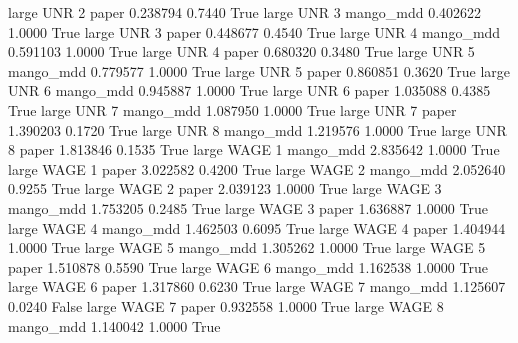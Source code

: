      large      UNR                 2                 paper      0.238794      0.7440    True
     large      UNR                 3             mango_mdd      0.402622      1.0000    True
     large      UNR                 3                 paper      0.448677      0.4540    True
     large      UNR                 4             mango_mdd      0.591103      1.0000    True
     large      UNR                 4                 paper      0.680320      0.3480    True
     large      UNR                 5             mango_mdd      0.779577      1.0000    True
     large      UNR                 5                 paper      0.860851      0.3620    True
     large      UNR                 6             mango_mdd      0.945887      1.0000    True
     large      UNR                 6                 paper      1.035088      0.4385    True
     large      UNR                 7             mango_mdd      1.087950      1.0000    True
     large      UNR                 7                 paper      1.390203      0.1720    True
     large      UNR                 8             mango_mdd      1.219576      1.0000    True
     large      UNR                 8                 paper      1.813846      0.1535    True
     large     WAGE                 1             mango_mdd      2.835642      1.0000    True
     large     WAGE                 1                 paper      3.022582      0.4200    True
     large     WAGE                 2             mango_mdd      2.052640      0.9255    True
     large     WAGE                 2                 paper      2.039123      1.0000    True
     large     WAGE                 3             mango_mdd      1.753205      0.2485    True
     large     WAGE                 3                 paper      1.636887      1.0000    True
     large     WAGE                 4             mango_mdd      1.462503      0.6095    True
     large     WAGE                 4                 paper      1.404944      1.0000    True
     large     WAGE                 5             mango_mdd      1.305262      1.0000    True
     large     WAGE                 5                 paper      1.510878      0.5590    True
     large     WAGE                 6             mango_mdd      1.162538      1.0000    True
     large     WAGE                 6                 paper      1.317860      0.6230    True
     large     WAGE                 7             mango_mdd      1.125607      0.0240   False
     large     WAGE                 7                 paper      0.932558      1.0000    True
     large     WAGE                 8             mango_mdd      1.140042      1.0000    True
